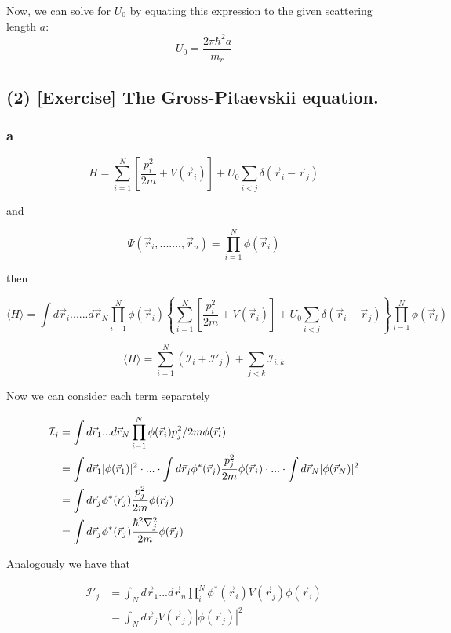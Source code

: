 \documentclass[12pt]{article}
\begin{document}
\begin{flushleft}
Now, we can solve for \( U_0 \) by equating this expression to the given scattering length \( a \):
\[
U_0 = \frac{2 \pi \hbar^2 a}{m_r}
\]








\subsection*{(2) [Exercise] The Gross-Pitaevskii equation.}

\subsubsection*{a}

\[
H = \sum_{i=1}^{N} \left[ \frac{p_{i}^{2}}{2m}  + V(\vec{r}_{i}) \right] + U_0 \sum_{i<j} \delta(\vec{r}_{i} - \vec{r}_{j})
\]

and 

\[
\Psi(\vec{r}_{i},.......,\vec{r}_{n}) = \prod_{i=1}^{N} \phi(\vec{r}_{i})
\]

then

\[
\langle H \rangle = \int d\vec{r}_{i} ...... d\vec{r}_{N} \prod^{N}_{i-1} \phi(\vec{r}_{i}) \left    \{\sum_{i=1}^{N} \left[ \frac{p_{i}^{2}}{2m}  + V(\vec{r}_{i}) \right] + U_0 \sum_{i<j} \delta(\vec{r}_{i} - \vec{r}_{j}) \right\} \prod_{l=1}^{N} \phi(\vec{r}_{l})
\]

\[
\langle H \rangle = \sum^{N}_{i=1} \left( \mathcal{I}_{i} + \mathcal{I'}_{j} \right) + \sum_{j<k} \mathcal{I}_{i,k}
\]

Now we can consider each term separately

\begin{align*}
    \tiny
    \mathcal{I}_{j} &= \int d\vec{r}_{1} ... d\vec{r}_{N} \prod^{N}_{i-1} \phi(\vec{r}_{i}) p_{j}^{2}/2m \phi(\vec{r}_{l}) \\
    &= \int d\vec{r}_{1} |\phi(\vec{r}_{1})|^{2} \cdot ... \cdot\int d\vec{r}_{j} \phi^{*}(\vec{r}_{j}) \frac{p^{2}_{j}}{2m} \phi(\vec{r}_{j}) \cdot ... \cdot \int d\vec{r}_{N} |\phi(\vec{r}_{N})|^{2} \\
    &= \int d\vec{r}_{j} \phi^{*}(\vec{r}_{j}) \frac{p^{2}_{j}}{2m} \phi(\vec{r}_{j})\\
    &= \int d\vec{r}_{j} \phi^{*}(\vec{r}_{j}) \frac{\hbar^{2}\nabla^{2}_{j}}{2m} \phi(\vec{r}_{j})
\end{align*}

Analogously we have that 

\begin{align*}
    \mathcal{I'}_{j} &= \int_{N} d\vec{r}_{1} ... d\vec{r}_{n} \prod^{N}_{i} \phi^{*}(\vec{r}_{i}) V(\vec{r}_{j}) \phi(\vec{r}_{i})\\
    &= \int_{N} d\vec{r}_{j} V(\vec{r}_{j}) |\phi(\vec{r}_{j})|^{2} \\
\end{align*}


\end{flushleft}
\end{document}
